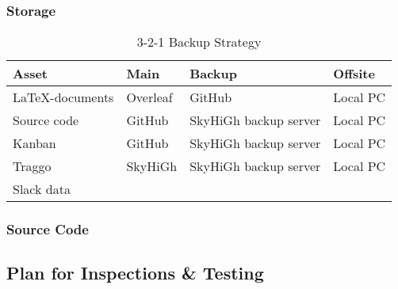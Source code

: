 \subsubsection{Storage}
\begin{table} [H]
    \centering
    \begin{tabular}{|l|l|l|l|}
    \hline
    Asset & Main & Backup & Offsite \\
    \hline
    \LaTeX-documents & Overleaf & GitHub & Local PC \\
    Source code & GitHub & SkyHiGh backup server & Local PC \\
    Kanban & GitHub & SkyHiGh backup server & Local PC \\
    Traggo & SkyHiGh & SkyHiGh backup server & Local PC \\
    Slack data & & & \\
    \hline
    \end{tabular}
    \caption{3-2-1 Backup Strategy}
    \label{tab:tools}
\end{table}

\begin{comment}
    https://stackoverflow.com/questions/19576742/how-to-clone-all-repos-at-once-from-github
    for auto clone til skyhigh
\end{comment}

\subsubsection{Source Code}

\subsection{Plan for Inspections \& Testing}\label{sec:plan_for_inspections_&_testing}

